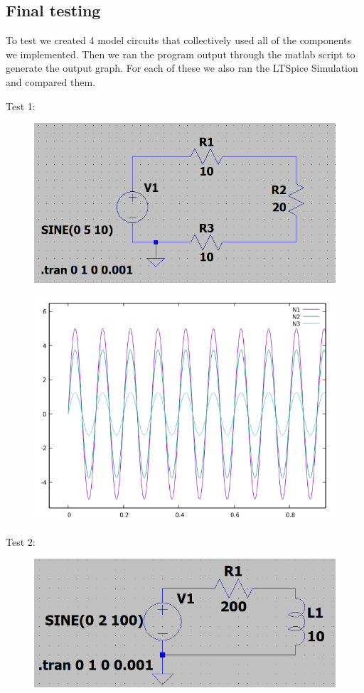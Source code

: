 \documentclass[12pt,a4paper]{article}
\begin{document}
\subsection{Final testing}
To test we created 4 model circuits that collectively used all of the components we implemented.
Then we ran the program output through the matlab script to generate the output graph. 
For each of these we also ran the LTSpice Simulation and compared them.
\par
Test 1:
\begin{figure} [h!]
	\centering
	\includegraphics[scale=0.75]{test_1_circuit.PNG}
\end{figure}
\begin{figure} [h!]
	\centering
	\includegraphics[scale=0.5]{test_1_output_graph.PNG}
\end{figure}
\par
\pagebreak
Test 2:
\begin{figure} [h!]
	\centering
	\includegraphics[scale=0.75]{test_2_circuit.PNG}
\end{figure}
\end{document}

